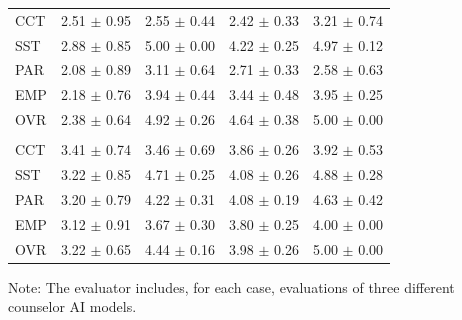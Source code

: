 \documentclass{wiley-article}
\begin{document}
\begin{table}[htbp]
\begin{threeparttable}
\begin{tabular}{lrrrr}
      CCT & 2.51 $\pm$ 0.95 & 2.55 $\pm$ 0.44 & 2.42 $\pm$ 0.33 & 3.21 $\pm$ 0.74\\
      SST & 2.88 $\pm$ 0.85 & 5.00 $\pm$ 0.00 & 4.22 $\pm$ 0.25 & 4.97 $\pm$ 0.12\\
      PAR & 2.08 $\pm$ 0.89 & 3.11 $\pm$ 0.64 & 2.71 $\pm$ 0.33 & 2.58 $\pm$ 0.63\\
      EMP & 2.18 $\pm$ 0.76 & 3.94 $\pm$ 0.44 & 3.44 $\pm$ 0.48 & 3.95 $\pm$ 0.25\\
      OVR & 2.38 $\pm$ 0.64 & 4.92 $\pm$ 0.26 & 4.64 $\pm$ 0.38 & 5.00 $\pm$ 0.00\\
      \addlinespace
      \multicolumn{5}{l}{\textit{Score for GPT-SMDP}}\\
      CCT & 3.41 $\pm$ 0.74 & 3.46 $\pm$ 0.69 & 3.86 $\pm$ 0.26 & 3.92 $\pm$ 0.53\\
      SST & 3.22 $\pm$ 0.85 & 4.71 $\pm$ 0.25 & 4.08 $\pm$ 0.26 & 4.88 $\pm$ 0.28\\
      PAR & 3.20 $\pm$ 0.79 & 4.22 $\pm$ 0.31 & 4.08 $\pm$ 0.19 & 4.63 $\pm$ 0.42\\
      EMP & 3.12 $\pm$ 0.91 & 3.67 $\pm$ 0.30 & 3.80 $\pm$ 0.25 & 4.00 $\pm$ 0.00\\
      OVR & 3.22 $\pm$ 0.65 & 4.44 $\pm$ 0.16 & 3.98 $\pm$ 0.26 & 5.00 $\pm$ 0.00\\
      \bottomrule
    \end{tabular}
    \begin{tablenotes}
      \footnotesize
      \item Note: The evaluator includes, for each case, evaluations of three different counselor AI models.
    \end{tablenotes}
  \end{threeparttable}
\end{table}
\end{document}
